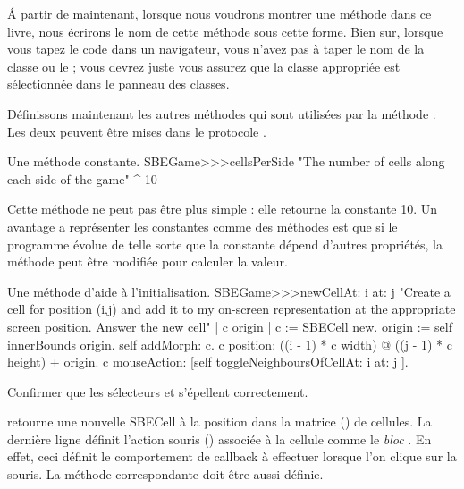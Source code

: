\documentclass[a4paper,10pt,twoside]{book}
\begin{document}
\'A partir de maintenant, lorsque nous voudrons montrer une méthode dans ce livre, nous écrirons le nom de cette méthode sous cette forme. Bien sur, lorsque vous tapez le code dans un navigateur, vous n'avez pas à taper le nom de la classe ou le \ct{>>>}; vous devrez juste vous assurez que la classe appropriée est sélectionnée dans le panneau des classes.

Définissons maintenant les autres méthodes qui sont utilisées par la méthode . Les deux peuvent être mises dans le protocole .

\begin{method}[sbegamecellsperside]{Une méthode constante.}
SBEGame>>>cellsPerSide
   "The number of cells along each side of the game"
   ^ 10
\end{method}

Cette méthode ne peut pas être plus simple : elle retourne la constante 10. Un avantage a représenter les constantes comme des méthodes est que si le programme évolue de telle sorte que la constante dépend d'autres propriétés, la méthode peut être modifiée pour calculer la valeur.

\begin{method}[newCellAt:at:]{Une méthode d'aide à l'initialisation.}
SBEGame>>>newCellAt: i at: j
   "Create a cell for position (i,j) and add it to my on-screen
   representation at the appropriate screen position.  Answer the new cell"
   | c origin |
   c := SBECell new.
   origin := self innerBounds origin.
   self addMorph: c.
   c position: ((i - 1) * c width) @ ((j - 1) * c height) + origin.
   c mouseAction: [self toggleNeighboursOfCellAt: i at: j ].
\end{method}

Confirmer que les sélecteurs  et  s'épellent correctement.

 retourne une nouvelle SBECell à la position  dans la matrice () de cellules.
La dernière ligne définit l'action souris () associée à la cellule comme le \emph{bloc}
\mbox{.}
En effet, ceci définit le comportement de callback à effectuer lorsque l'on clique sur la souris.
La méthode correspondante doit être aussi définie.
\end{document}
